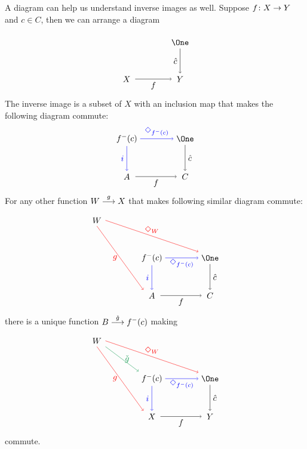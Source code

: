 A diagram can help us understand inverse images as well. Suppose $\fromto fXY$ and $c\in C$,
then we can arrange a diagram 

\[
\begin{tikzpicture}
\matrix (m) [row sep=3em,column sep=4em,minimum width=2em]
{
	& \node (one) {$\One$};\\
	\node (A) {$X$}; & \node (C) {$Y$};\\
};
\draw[->] (A.east) -- node[anchor=north]  {$f$} (C.west) ;
\draw[->] (one.south) -- node[anchor=east]  {$\hat c$} (C.north);
\end{tikzpicture}
\]
The inverse image is a subset of $X$ with an inclusion map that makes the following diagram commute:
\[
\begin{tikzpicture}
\matrix (m) [row sep=3em,column sep=4em,minimum width=2em]
{
	\node (inv) {$f^-(c)$}; & \node (one) {$\One$};\\
	\node (A) {$A$}; & \node (C) {$C$};\\
};
\draw[->] (A.east) -- node[anchor=north]  {$f$} (C.west) ;
\draw[->] (one.south) -- node[anchor=west]  {$\hat c$} (C.north);
\draw[->,blue] (inv.south) -- node[anchor=east] {$i$} (A.north);
\draw[->,blue] (inv.east) -- node[anchor=south] {$\Diamond_{f^-(c)}$} (one.west);
\end{tikzpicture}
\]
For any other function $\sfromto gWX$ that makes following similar diagram commute:
\[
\begin{tikzpicture}
\matrix (m) [row sep=3em,column sep=4em,minimum width=2em]
{
	\node (B) {$W$};\\
	&\node (inv) {$f^-(c)$}; & \node (one) {$\One$};\\
	&\node (A) {$A$}; & \node (C) {$C$};\\
};
\draw[->] (A.east) -- node[anchor=north]  {$f$} (C.west) ;
\draw[->] (one.south) -- node[anchor=west]  {$\hat c$} (C.north);
\draw[->,blue] (inv.south) -- node[anchor=east] {$i$} (A.north);
\draw[->,blue] (inv.east) -- node[anchor=north] {$\Diamond_{f^-(c)}$} (one.west);
\draw[->,red] (B.south) -- node[anchor=east] {$g$} (A.north west);
\draw[->,red] (B.east) -- node[anchor=south] {$\Diamond_W$} (one.north west);
\end{tikzpicture}
\]
there is a unique function $\sfromto {\check g}B{f^-(c)}$ making
\[
\begin{tikzpicture}
\matrix (m) [row sep=3em,column sep=4em,minimum width=2em]
{
	\node (B) {$W$};\\
	&\node (inv) {$f^-(c)$}; & \node (one) {$\One$};\\
	&\node (A) {$X$}; & \node (C) {$Y$};\\
};
\draw[->] (A.east) -- node[anchor=north]  {$f$} (C.west) ;
\draw[->] (one.south) -- node[anchor=west]  {$\hat c$} (C.north);
\draw[->,blue] (inv.south) -- node[anchor=east] {$i$} (A.north);
\draw[->,blue] (inv.east) -- node[anchor=north] {$\Diamond_{f^-(c)}$} (one.west);
\draw[->,red] (B.south) -- node[anchor=east] {$g$} (A.north west);
\draw[->,red] (B.east) -- node[anchor=south] {$\Diamond_W$} (one.north west);
\draw[->, ForestGreen] (B.south east) -- node[anchor=west] {$\check g$} (inv.north west);
\end{tikzpicture}
\]
commute.

